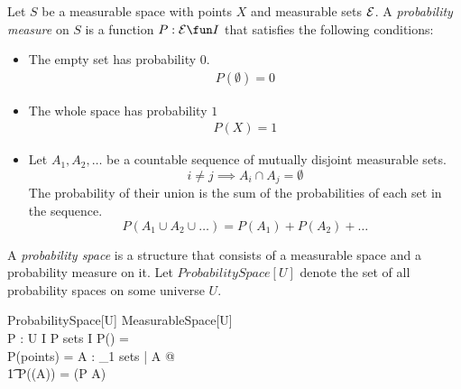 \documentclass{article}
\begin{document}
Let $S$ be a measurable space with points $X$ and measurable sets ${\cal E}$.
A {\it probability measure} on $S$ is a function $P : \calE \fun I$ that satisfies the following conditions:
\begin{itemize}

\item The empty set has probability $0$.
\begin{eqnarray}
	P(\emptyset) = 0
\end{eqnarray}

\item The whole space has probability $1$
\begin{eqnarray}
	P(X) = 1
\end{eqnarray}

\item Let $A_1, A_2, \ldots$ be a countable sequence of mutually disjoint measurable sets. 
\begin{equation}
	i \neq j \implies A_i \cap A_j = \emptyset
\end{equation}
The probability of their union is the sum of the probabilities of each set in the sequence.
\begin{equation}
	P(A_1 \cup A_2 \cup \ldots) = P(A_1) + P(A_2) + \ldots
\end{equation}

\end{itemize}

A {\it probability space} is a structure that consists of a measurable space and a probability measure on it.
Let $ProbabilitySpace[U]$ denote the set of all probability spaces on some universe $U$.
\begin{schema}{ProbabilitySpace}[U]
	MeasurableSpace[U] \\
	P : \power U \pfun I
\where
	P \in sets \fun I
\also
	P(\emptyset) = \realzero \\
	P(points) = \realone
\also
	\forall A : \nat_1 \fun sets | \disjoint A @ \\
\t1		P(\bigcup (\ran A)) = \realsum(P \circ A)
\end{schema}


\end{document}

